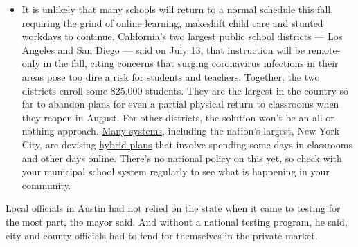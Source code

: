 \begin{itemize}
  \begin{itemize}
  \tightlist
  \item
    It is unlikely that many schools will return to a normal schedule
    this fall, requiring the grind of
    \href{https://www.nytimes3xbfgragh.onion/2020/06/05/us/coronavirus-education-lost-learning.html?action=click\&pgtype=Article\&state=default\&region=MAIN_CONTENT_3\&context=storylines_faq}{online
    learning},
    \href{https://www.nytimes3xbfgragh.onion/2020/05/29/us/coronavirus-child-care-centers.html?action=click\&pgtype=Article\&state=default\&region=MAIN_CONTENT_3\&context=storylines_faq}{makeshift
    child care} and
    \href{https://www.nytimes3xbfgragh.onion/2020/06/03/business/economy/coronavirus-working-women.html?action=click\&pgtype=Article\&state=default\&region=MAIN_CONTENT_3\&context=storylines_faq}{stunted
    workdays} to continue. California's two largest public school
    districts --- Los Angeles and San Diego --- said on July 13, that
    \href{https://www.nytimes3xbfgragh.onion/2020/07/13/us/lausd-san-diego-school-reopening.html?action=click\&pgtype=Article\&state=default\&region=MAIN_CONTENT_3\&context=storylines_faq}{instruction
    will be remote-only in the fall}, citing concerns that surging
    coronavirus infections in their areas pose too dire a risk for
    students and teachers. Together, the two districts enroll some
    825,000 students. They are the largest in the country so far to
    abandon plans for even a partial physical return to classrooms when
    they reopen in August. For other districts, the solution won't be an
    all-or-nothing approach.
    \href{https://bioethics.jhu.edu/research-and-outreach/projects/eschool-initiative/school-policy-tracker/}{Many
    systems}, including the nation's largest, New York City, are
    devising
    \href{https://www.nytimes3xbfgragh.onion/2020/06/26/us/coronavirus-schools-reopen-fall.html?action=click\&pgtype=Article\&state=default\&region=MAIN_CONTENT_3\&context=storylines_faq}{hybrid
    plans} that involve spending some days in classrooms and other days
    online. There's no national policy on this yet, so check with your
    municipal school system regularly to see what is happening in your
    community.
  \end{itemize}
\end{itemize}

Local officials in Austin had not relied on the state when it came to
testing for the most part, the mayor said. And without a national
testing program, he said, city and county officials had to fend for
themselves in the private market.

